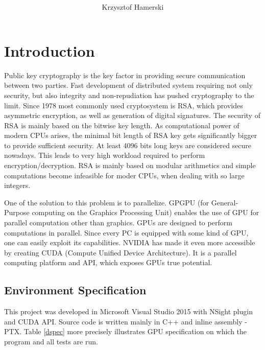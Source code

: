 \documentclass[oneside,openright,12pt,final,en]{mgr}
\title{ }
\author{Krzysztof Hamerski}
\begin{document}


\maketitle 
\tableofcontents

\chapter{Introduction}

Public key cryptography is the key factor in providing secure communication between two parties. Fast development of distributed system requiring not only security, but also integrity and non-repudiation has pushed cryptography to the limit. Since 1978\cite{rsa} most commonly used cryptosystem is RSA, which provides asymmetric encryption, as well as generation of digital signatures. The security of RSA is mainly based on the bitwise key length. As computational power of modern CPUs arises, the minimal bit length of RSA key gets significantly bigger to provide sufficient security. At least 4096 bits long keys are considered secure nowadays. This leads to very high workload required to perform encryption/decryption. RSA is mainly based on modular arithmetics and simple computations become infeasible for moder CPUs, when dealing with so large integers. 

One of the solution to this problem is to parallelize. GPGPU\cite{gpgpu} (for General-Purpose
computing on the Graphics Processing Unit) enables the use of GPU for parallel computation other than graphics. GPUs are designed to perform computations in parallel. Since every PC is equipped with some kind of GPU, one can easily exploit its capabilities.    
NVIDIA has made it even more accessible by creating CUDA (Compute Unified Device Architecture)\cite{cuda}. It is a parallel computing platform and API, which exposes GPUs true potential. 
  
\section{Environment Specification}
This project was developed in Microsoft Visual Studio 2015\cite{vs} with NSight plugin and CUDA API.\cite{cuda} Source code is written mainly in C++ and inline assembly - PTX.\cite{ptx} Table \ref{dspec} more precisely illustrates GPU specification on which the program and all tests are run.
\end{document}
